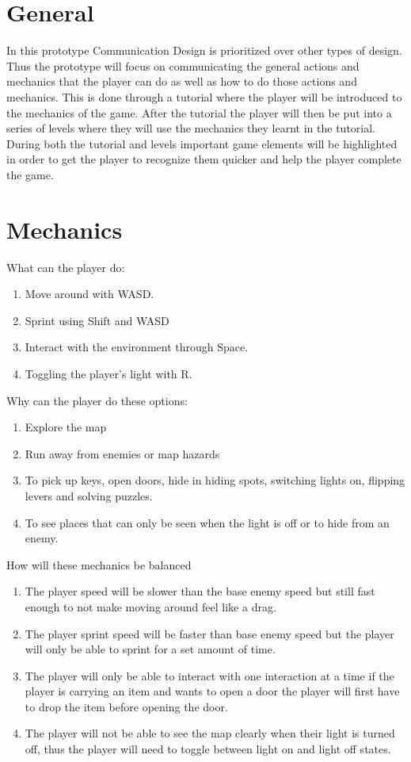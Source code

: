 \documentclass{article}
\begin{document}
\section{General}
In this prototype Communication Design is prioritized over other types of design.
Thus the prototype will focus on communicating the general actions and mechanics 
that the player can do as well as how to do those actions and mechanics. This is
done through a tutorial where the player will be introduced to the mechanics of 
the game. After the tutorial the player will then be put into a series of levels
where they will use the mechanics they learnt in the tutorial. During both the tutorial
and levels important game elements will be highlighted in order to get the player
to recognize them quicker and help the player complete the game.


\section{Mechanics}
What can the player do:
\begin{enumerate}
    \item Move around with WASD.
    \item Sprint using Shift and WASD
    \item Interact with the environment through Space.
    \item Toggling the player's light with R.
\end{enumerate}
Why can the player do these options:
\begin{enumerate}
    \item Explore the map
    \item Run away from enemies or map hazards
    \item To pick up keys, open doors, hide in hiding spots, 
    switching lights on, flipping levers and solving puzzles.
    \item To see places that can only be seen when the light is off
    or to hide from an enemy.
\end{enumerate}
How will these mechanics be balanced
\begin{enumerate}
    \item The player speed will be slower than the base enemy speed
    but still fast enough to not make moving around feel like a drag.
    \item The player sprint speed will be faster than base enemy speed
    but the player will only be able to sprint for a set amount of time.
    \item The player will only be able to interact with one interaction at a time
    if the player is carrying an item and wants to open a door the player
    will first have to drop the item before opening the door.
    \item The player will not be able to see the map clearly when their
    light is turned off, thus the player will need to toggle between light
    on and light off states.
\end{enumerate}
\end{document}
